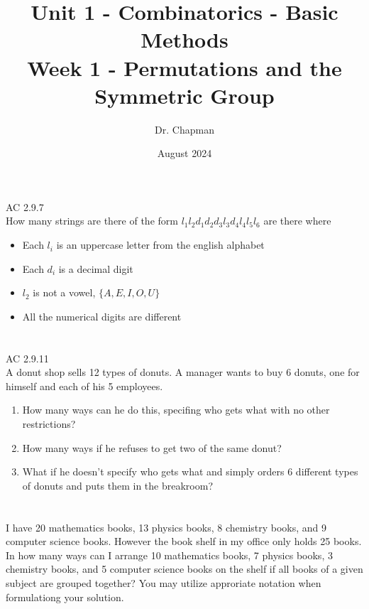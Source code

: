 \documentclass{article}
\title{Unit 1 - Combinatorics - Basic Methods\\ Week 1 - Permutations and the Symmetric Group}
\author{Dr. Chapman}
\date{August 2024}
\begin{document}
\maketitle

\section{}
AC 2.9.7\\
How many strings are there of the form $l_1l_2d_1d_2d_3l_3d_4l_4l_5l_6$ are there where
\begin{itemize}
  \item Each $l_i$ is an uppercase letter from the english alphabet
  \item Each $d_i$ is a decimal digit
  \item $l_2$ is not a vowel, $\{A, E, I, O, U\}$
  \item All the numerical digits are different
\end{itemize}
\section{}
AC 2.9.11\\
A donut shop sells 12 types of donuts. A manager wants to buy 6 donuts, one for himself and each of his 5 employees.
\begin{enumerate}
    \item How many ways can he do this, specifing who gets what with no other restrictions?
    \item How many ways if he refuses to get two of the same donut?
    \item What if he doesn't specify who gets what and simply orders 6 different types of donuts and puts them in the breakroom?
\end{enumerate}
\section{}
I have 20 mathematics books, 13 physics books, 8 chemistry books, and 9 computer science books. However the book shelf in my office only holds 25 books. In how many ways can I arrange 10 mathematics books, 7 physics books, 3 chemistry books, and 5 computer science books on the shelf if all books of a given subject are grouped together? You may utilize approriate notation when formulationg your solution.
\end{document}
